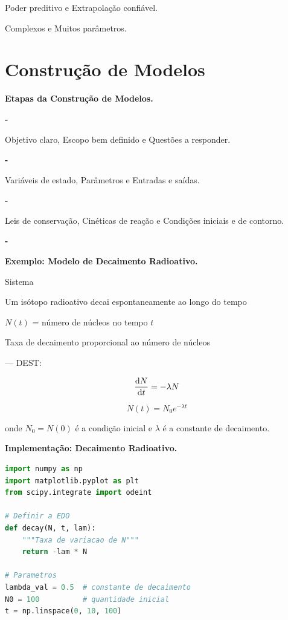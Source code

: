 Poder preditivo e Extrapolação confiável.

Complexos e Muitos parâmetros.

\section{Construção de Modelos}

\textbf{Etapas da Construção de Modelos.}

\textbf{-}

Objetivo claro, Escopo bem definido e Questões a responder.

\textbf{-}

Variáveis de estado, Parâmetros e Entradas e saídas.

\textbf{-}

Leis de conservação, Cinéticas de reação e Condições iniciais e de contorno.

\textbf{-}

\textbf{Exemplo: Modelo de Decaimento Radioativo.}

Sistema

Um isótopo radioativo decai espontaneamente ao longo do tempo

 $N(t)$ = número de núcleos no tempo $t$

 Taxa de decaimento proporcional ao número de núcleos

--- DEST: 

%
\begin{equation*}
\frac{\mathrm{d} N}{\mathrm{d} t} = -\lambda N
\end{equation*}
%

%
\begin{equation*}
N(t) = N_0 e^{-\lambda t}
\end{equation*}
%

onde $N_0 = N(0)$ é a condição inicial e $\lambda$ é a constante de decaimento.

\textbf{Implementação: Decaimento Radioativo.}

%
\begin{lstlisting}[language=Python, caption=Solução numérica do decaimento, basicstyle=\ttfamily\footnotesize]
import numpy as np
import matplotlib.pyplot as plt
from scipy.integrate import odeint

# Definir a EDO
def decay(N, t, lam):
    """Taxa de variacao de N"""
    return -lam * N

# Parametros
lambda_val = 0.5  # constante de decaimento
N0 = 100          # quantidade inicial
t = np.linspace(0, 10, 100)
\end{lstlisting}
%

